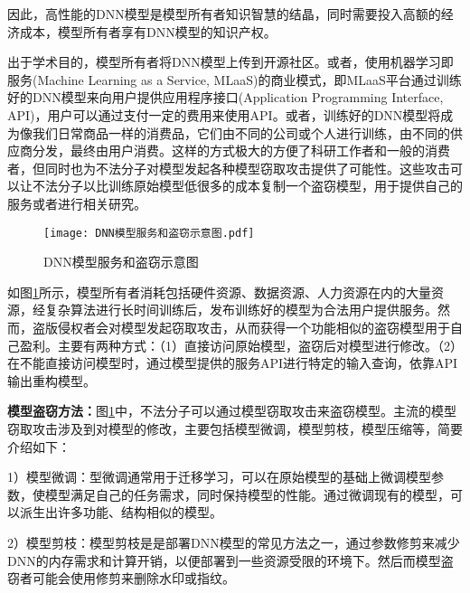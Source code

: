 因此，高性能的DNN模型是模型所有者知识智慧的结晶，同时需要投入高额的经济成本，模型所有者享有DNN模型的知识产权\cite{wang2021fingerprinting,li2020protecting}。

出于学术目的，模型所有者将DNN模型上传到开源社区。或者，使用机器学习即服务(Machine Learning as a Service, MLaaS)\cite{tanuwidjaja2020privacy}的商业模式，即MLaaS平台通过训练好的DNN模型来向用户提供应用程序接口(Application Programming Interface, API)\cite{ofoeda2019application}，用户可以通过支付一定的费用来使用API。或者，训练好的DNN模型将成为像我们日常商品一样的消费品，它们由不同的公司或个人进行训练，由不同的供应商分发，最终由用户消费。这样的方式极大的方便了科研工作者和一般的消费者，但同时也为不法分子对模型发起各种模型窃取攻击\cite{hu2021stealing,yue2021black}提供了可能性。这些攻击可以让不法分子以比训练原始模型低很多的成本复制一个盗窃模型，用于提供自己的服务或者进行相关研究。

\begin{figure}[htbp]%
	\centering
	\setlength{\abovecaptionskip}{5mm} %
	\texttt{[image: DNN模型服务和盗窃示意图.pdf]}
	\caption{DNN模型服务和盗窃示意图}
	\label{DNN模型服务和盗窃示意图}
	\end {figure}
	
如图\ref{DNN模型服务和盗窃示意图}所示，模型所有者消耗包括硬件资源、数据资源、人力资源在内的大量资源，经复杂算法进行长时间训练后，发布训练好的模型为合法用户提供服务。然而，盗版侵权者会对模型发起窃取攻击，从而获得一个功能相似的盗窃模型用于自己盈利。主要有两种方式：（1）直接访问原始模型，盗窃后对模型进行修改。（2）在不能直接访问模型时，通过模型提供的服务API进行特定的输入查询，依靠API输出重构模型。

\textbf{模型盗窃方法：}图\ref{DNN模型服务和盗窃示意图}中，不法分子可以通过模型窃取攻击来盗窃模型。主流的模型窃取攻击涉及到对模型的修改，主要包括模型微调\cite{guo2019spottune}，模型剪枝\cite{liu2018rethinking}，模型压缩\cite{deng2020model}等，简要介绍如下：

1）模型微调：型微调通常用于迁移学习，可以在原始模型的基础上微调模型参数，使模型满足自己的任务需求，同时保持模型的性能。通过微调现有的模型，可以派生出许多功能、结构相似的模型。

2）模型剪枝：模型剪枝是是部署DNN模型的常见方法之一，通过参数修剪来减少DNN的内存需求和计算开销，以便部署到一些资源受限的环境下。然后而模型盗窃者可能会使用修剪来删除水印或指纹。

